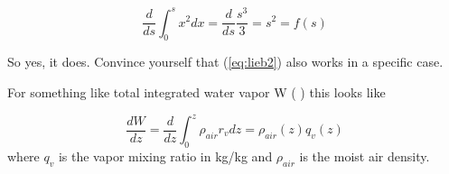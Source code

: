 \documentclass[12pt]{article}
\begin{document}
\begin{equation}
  \label{eq:specif}
  \frac{d}{ds} \int_0^s x^2 dx = \frac{d}{ds} \frac{s^3}{3} = s^2 =f(s)
\end{equation}

So yes, it does.  Convince yourself that (\ref{eq:lieb2}) also works in a specific case.

For something like total integrated water vapor W (  ) this looks 
like

\begin{equation}
  \label{eq:taudown}
\frac{d W}{dz} = \frac{d}{dz} \int_0^z \rho_{air} r_v dz =  \rho_{air} (z)  q_v(z)
\end{equation}
where $q_v$ is the vapor mixing ratio in kg/kg and $\rho_{air}$ is the
moist air density.
\end{document}
